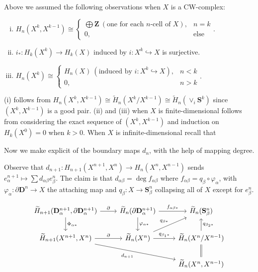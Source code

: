 \documentclass[11pt]{article}
\theoremstyle{definition}
\theoremstyle{plain}
\newcommand{\Z}{\mathbf{Z}}
\begin{document}
Above we assumed the following observations when $X$ is a CW-complex:
\begin{enumerate}[(i)]
\item $H_n(X^k,X^{k-1})\cong\begin{cases}\bigoplus\Z\ (\textrm{one for each }n\textrm{-cell of }X),&n=k\\0,&\textrm{else}
\end{cases}$.

\item $i_\ast:H_k(X^k)\to H_k(X)$ induced by $i:X^k\hookrightarrow X$ is surjective.

\item $H_n(X^k)\cong\begin{cases}H_n(X)\ (\textrm{induced by }i:X^k\hookrightarrow X),&n<k\\0,&n>k
\end{cases}$.
\end{enumerate}
(i) follows from $H_n(X^k,X^{k-1})\cong\widetilde{H}_n(X^k/X^{k-1})\cong\widetilde{H}_n(\vee_i\mathbf{S}^k)$ since $(X^k,X^{k-1})$ is a good pair. (ii) and (iii) when $X$ is finite-dimensional follows from considering the exact sequence of $(X^k,X^{k-1})$ and induction on $H_k(X^0)=0$ when $k>0$. When $X$ is infinite-dimensional recall that\medbreak

Now we make explicit of the boundary maps $d_n$, with the help of mapping degree.\medbreak

Observe that $d_{n+1}:H_{n+1}(X^{n+1},X^n)\to H_n(X^n,X^{n-1})$ sends $e_\alpha^{n+1}\mapsto\sum d_{\alpha\beta}e^n_\beta$. The claim is that $d_{\alpha\beta}=\deg f_{\alpha\beta}$ where $f_{\alpha\beta}=q_\beta\circ\varphi_\alpha$, with $\varphi_\alpha:\partial\mathbf{D}^n\to X$ the attaching map and $q_\beta:X\to\mathbf{S}^n_\beta$ collapsing all of $X$ except for $e_\beta^n$.

\[\begin{tikzcd}
\widetilde{H}_{n+1}(\mathbf{D}_\alpha^{n+1},\partial\mathbf{D}^{n+1}_\alpha)\arrow{d}{\Phi_{\alpha\ast}}\arrow{r}{\partial}&\widetilde{H}_n(\partial\mathbf{D}_\alpha^{n+1})\arrow{d}{\varphi_{\alpha\ast}}\arrow{r}{f_{\alpha\beta\ast}}&\widetilde{H}_n(\mathbf{S}_\beta^n)\\
\widetilde{H}_{n+1}(X^{n+1},X^n)\arrow[swap]{drr}{d_{n+1}}\arrow{r}{\partial}&\widetilde{H}_n(X^n)\arrow{ur}{q_{\beta\ast}}\arrow{r}{q_{\beta_1\ast}}&\widetilde{H}_n(X^n/X^{n-1})\arrow[swap]{u}{q_{\beta_2\ast}}\\
&&\widetilde{H}_n(X^n,X^{n-1})\arrow[equal]{u}
\end{tikzcd}\]
\end{document}
